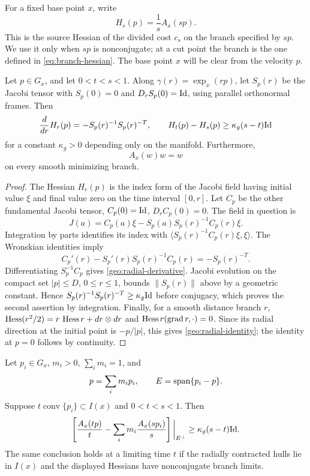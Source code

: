 For a fixed base point $x$, write
\[
 H_s(p)=\frac1s A_x(sp).
\]
This is the source Hessian of the divided cost $c_s$ on the branch
specified by $sp$. We use it only when $sp$ is nonconjugate; at a cut
point the branch is the one defined in \cref{eq:branch-hessian}.
The base point $x$ will be clear from the velocity $p$.

\begin{lemma}
\label{geo:radial-index}
Let $p\in G_x$, and let $0<t<s<1$.  Along
$\gamma(r)=\exp_x(rp)$, let $S_p(r)$ be the Jacobi tensor with
$S_p(0)=0$ and $D_rS_p(0)=\mathrm{Id}$, using parallel orthonormal frames.
Then
\begin{equation}
 \label{geo:radial-derivative}
 \frac{d}{dr}H_r(p)=-S_p(r)^{-1}S_p(r)^{-T},
 \qquad
 H_t(p)-H_s(p)\geq\kappa_g(s-t)\mathrm{Id}
\end{equation}
for a constant $\kappa_g>0$ depending only on the manifold.
Furthermore,
\begin{equation}
 \label{geo:radial-identity}
 A_x(w)w=w
\end{equation}
on every smooth minimizing branch.
\end{lemma}

\begin{proof}
The Hessian $H_r(p)$ is the index form of the Jacobi field having
initial value $\xi$ and final value zero on the time interval $[0,r]$.
Let $C_p$ be the other fundamental Jacobi tensor,
$C_p(0)=\mathrm{Id}$, $D_rC_p(0)=0$.  The field in question is
\[
 J(a)=C_p(a)\xi-S_p(a)S_p(r)^{-1}C_p(r)\xi.
\]
Integration by parts identifies its index with
$\langle S_p(r)^{-1}C_p(r)\xi,\xi\rangle$.
The Wronskian identities imply
\[
 C_p'(r)-S_p'(r)S_p(r)^{-1}C_p(r)=-S_p(r)^{-T}.
\]
Differentiating $S_p^{-1}C_p$ gives
\eqref{geo:radial-derivative}.  Jacobi evolution on the compact set
$|p|\leq D$, $0\leq r\leq1$, bounds $\|S_p(r)\|$ above by a
geometric constant.  Hence
$S_p(r)^{-1}S_p(r)^{-T}\geq\kappa_g\mathrm{Id}$ before conjugacy,
which proves the second assertion by integration.  Finally, for a
smooth distance branch $r$,
$\operatorname{Hess}(r^2/2)=r\,\operatorname{Hess} r+dr\otimes dr$ and
$\operatorname{Hess} r(\operatorname{grad} r,\cdot)=0$.  Since its
radial direction at the initial point is $-p/|p|$, this gives
\eqref{geo:radial-identity}; the identity at $p=0$ follows by continuity.
\end{proof}

\begin{lemma}
\label{geo:slack}
Let $p_i\in G_x$, $m_i>0$, $\sum_i m_i=1$, and
\[
 p=\sum_i m_ip_i,\qquad E=\operatorname{span}\{p_i-p\}.
\]
Suppose $t\operatorname{conv}\{p_i\}\subset I(x)$ and
$0<t<s<1$.  Then
\begin{equation}
 \label{geo:transverse-slack}
 \left[\frac{A_x(tp)}t-
       \sum_i m_i\frac{A_x(sp_i)}s\right]\bigg|_{E^\perp}
 \geq\kappa_g(s-t)\mathrm{Id}.
\end{equation}
The same conclusion holds at a limiting time $t$ if the radially
contracted hulls lie in $I(x)$ and the displayed Hessians have
nonconjugate branch limits.
\end{lemma}

